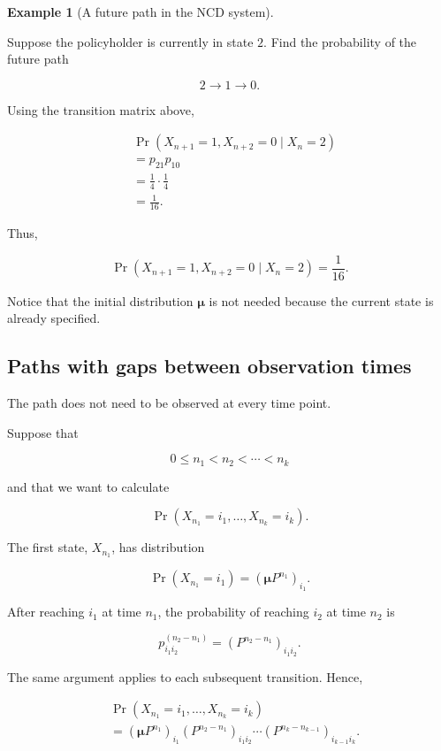 \documentclass[
  letterpaper,
  DIV=11,
  numbers=noendperiod]{scrartcl}
\theoremstyle{definition}
\newtheorem{example}{Example}[section]
\theoremstyle{remark}
\begin{document}
\begin{example}[A future path in the NCD
system]\protect\hypertarget{exm-ncd-4}{}\label{exm-ncd-4}

Suppose the policyholder is currently in state \(2\). Find the
probability of the future path

\[
2\longrightarrow1\longrightarrow0.
\]

Using the transition matrix above,

\[
\begin{aligned}
&\Pr(X_{n+1}=1,X_{n+2}=0\mid X_n=2)\\
&=
p_{21}p_{10}\\
&=
\frac14\cdot\frac14\\
&=
\frac{1}{16}.
\end{aligned}
\]

Thus,

\[
\boxed{
\Pr(X_{n+1}=1,X_{n+2}=0\mid X_n=2)
=
\frac{1}{16}.
}
\]

\end{example}

Notice that the initial distribution \(\boldsymbol{\mu}\) is not needed
because the current state is already specified.

\subsection{Paths with gaps between observation
times}\label{paths-with-gaps-between-observation-times}

The path does not need to be observed at every time point.

Suppose that

\[
0\leq n_1<n_2<\cdots<n_k
\]

and that we want to calculate

\[
\Pr(X_{n_1}=i_1,\ldots,X_{n_k}=i_k).
\]

The first state, \(X_{n_1}\), has distribution

\[
\Pr(X_{n_1}=i_1)
=
(\boldsymbol{\mu}P^{n_1})_{i_1}.
\]

After reaching \(i_1\) at time \(n_1\), the probability of reaching
\(i_2\) at time \(n_2\) is

\[
p_{i_1i_2}^{(n_2-n_1)}
=
(P^{n_2-n_1})_{i_1i_2}.
\]

The same argument applies to each subsequent transition. Hence,

\[
\boxed{
\begin{aligned}
&\Pr(X_{n_1}=i_1,\ldots,X_{n_k}=i_k)\\
&=
(\boldsymbol{\mu}P^{n_1})_{i_1}
(P^{n_2-n_1})_{i_1i_2}
\cdots
(P^{n_k-n_{k-1}})_{i_{k-1}i_k}.
\end{aligned}
}
\]
\end{document}
